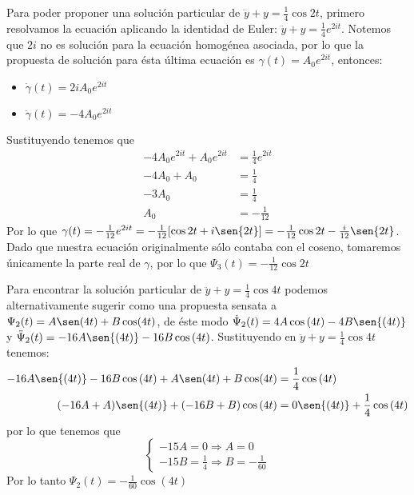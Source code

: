 \documentclass{article}
\begin{document}
\begin{enumerate}
{            Para poder proponer una solución particular de $\ddot y+y=\frac{1}{4}\cos{2t}$, primero
            resolvamos la ecuación aplicando la identidad de Euler: $\ddot y+y=\frac{1}{4}e^{2it}$.
            Notemos que $2i$ no es solución para la ecuación homogénea asociada, por lo que la
            propuesta de solución para ésta última ecuación es $\gamma(t)=A_0e^{2it}$, entonces:
            \begin{itemize}
                \item $\dot\gamma(t)=2iA_0e^{2it}$
                \item $\ddot\gamma(t)=-4A_0e^{2it}$
            \end{itemize}
            Sustituyendo tenemos que
            \begin{align*}
                -4A_0e^{2it}+A_0e^{2it} &= \frac{1}{4}e^{2it} \\[0.2cm]
                -4A_0+A_0 &= \frac{1}{4} \\[0.2cm]
                -3A_0 &= \frac{1}{4} \\[0.2cm]
                A_0 &= -\frac{1}{12}
            \end{align*}
            Por lo que $\gamma(t)=-\frac{1}{12}e^{2it}=-\frac{1}{12}[\cos{2t}+i\sen{2t}]
            =-\frac{1}{12}\cos{2t}-\frac{i}{12}\sen{2t}$. Dado que nuestra ecuación originalmente
            sólo contaba con el coseno, tomaremos únicamente la parte real de $\gamma$, por lo que
            $\Psi_3(t)=-\frac{1}{12}\cos{2t}$

            Para encontrar la solución particular de $\ddot y+y=\frac{1}{4}\cos{4t}$ podemos
            alternativamente sugerir como una propuesta sensata a $\Psi_2(t)=A\sen(4t)+B\cos(4t)$,
            de éste modo $\dot\Psi_2(t)=4A\cos{(4t)}-4B\sen{(4t)}$ y $\ddot\Psi_2(t)=-16A\sen{(4t)}
            -16B\cos{(4t)}$. Sustituyendo en $\ddot y+y=\frac{1}{4}\cos{4t}$ tenemos:
            \begin{align*}
                -16A\sen{(4t)}-16B\cos{(4t)}+A\sen(4t)+B\cos(4t) &= \frac{1}{4}\cos{(4t)} \\
                (-16A+A)\sen{(4t)}+(-16B+B)\cos{(4t)} &= 0\sen{(4t)}+\frac{1}{4}\cos{(4t)} \\
            \end{align*}
            por lo que tenemos que
            \begin{equation*}
                \begin{cases}
                    -15A=0 \Rightarrow A=0 \\
                    -15B=\frac{1}{4} \Rightarrow B=-\frac{1}{60}
                \end{cases}
            \end{equation*}
            Por lo tanto $\Psi_2(t)=-\frac{1}{60}\cos{(4t)}$

}
\end{enumerate}
\end{document}

